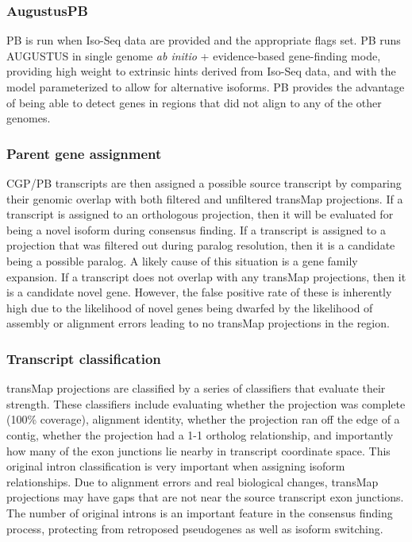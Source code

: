 \documentclass[fleqn,10pt]{wlscirep}
\begin{document}
\subsubsection*{AugustusPB}
	PB is run when Iso-Seq data are provided and the appropriate flags set. PB runs AUGUSTUS in single genome \textit{ab initio} + evidence-based gene-finding mode, providing high weight to extrinsic hints derived from Iso-Seq data, and with the model parameterized to allow for alternative isoforms. PB provides the advantage of being able to detect genes in regions that did not align to any of the other genomes.
  
\subsubsection*{Parent gene assignment}
CGP/PB transcripts are then assigned a possible source transcript by comparing their genomic overlap with both filtered and unfiltered transMap projections. If a transcript is assigned to an orthologous projection, then it will be evaluated for being a novel isoform during consensus finding. If a transcript is assigned to a projection that was filtered out during paralog resolution, then it is a candidate being a possible paralog. A likely cause of this situation is a gene family expansion. If a transcript does not overlap with any transMap projections, then it is a candidate novel gene. However, the false positive rate of these is inherently high due to the likelihood of novel genes being dwarfed by the likelihood of assembly or alignment errors leading to no transMap projections in the region.

\subsubsection*{Transcript classification}
	transMap projections are classified by a series of classifiers that evaluate their strength. These classifiers include evaluating whether the projection was complete (100\% coverage), alignment identity, whether the projection ran off the edge of a contig, whether the projection had a 1-1 ortholog relationship, and importantly how many of the exon junctions lie nearby in transcript coordinate space. This original intron classification is very important when assigning isoform relationships. Due to alignment errors and real biological changes, transMap projections may have gaps that are not near the source transcript exon junctions. The number of original introns is an important feature in the consensus finding process, protecting from retroposed pseudogenes as well as isoform switching.
  
\end{document}
